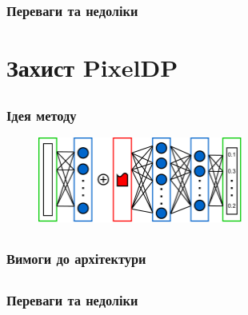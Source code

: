 \documentclass{beamer}
\numberwithin{equation}{section}
\begin{document}
	\subsection{}
	
	\begin{frame}
		\frametitle{Переваги та недоліки}
		
	\end{frame}
	
	
	\section{Захист PixelDP}
	\subsection{}
	\begin{frame}
		\frametitle{Ідея методу}
		
		\begin{figure}[h]
			\centering
			\includegraphics[width=0.6\textwidth]{../images/diagrams-PixelDP-small.pdf}
			
		\end{figure}
	\end{frame}

	\subsection{}
	\begin{frame}
		\frametitle{Вимоги до архітектури}
		
	\end{frame}

	\subsection{}
	\begin{frame}
		\frametitle{Переваги та недоліки}
		
	\end{frame}
\end{document}
